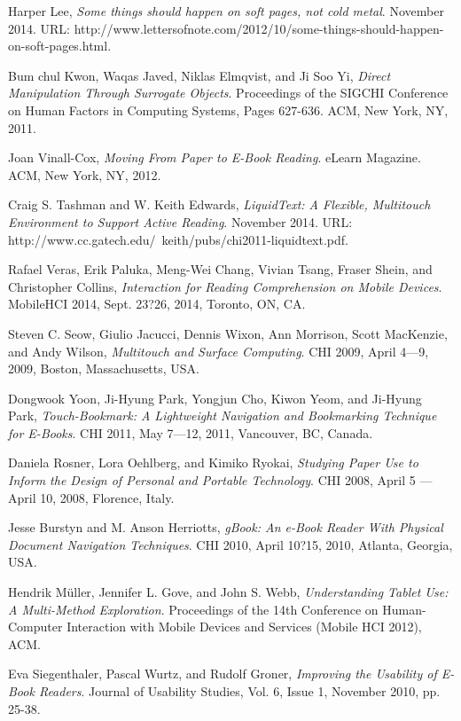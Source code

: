 \documentclass[11pt, oneside]{article}   	%
\begin{document}
\begin{thebibliography}{9}

  Harper Lee,
  \emph{Some things should happen on soft pages, not cold metal}.
  November 2014.
  URL: http://www.lettersofnote.com/2012/10/some-things-should-happen-on-soft-pages.html.
  
  Bum chul Kwon, Waqas Javed, Niklas Elmqvist, and Ji Soo Yi,
  \emph{Direct Manipulation Through Surrogate Objects}.
  Proceedings of the SIGCHI Conference on Human Factors in Computing Systems,
  Pages 627-636.
  ACM, New York, NY,
  2011.
  
  Joan Vinall-Cox,
  \emph{Moving From Paper to E-Book Reading}.
  eLearn Magazine.
  ACM, New York, NY,
  2012.
  
  Craig S. Tashman and W. Keith Edwards,
  \emph{LiquidText: A Flexible, Multitouch Environment to Support Active Reading}.
  November 2014.
  URL: http://www.cc.gatech.edu/~keith/pubs/chi2011-liquidtext.pdf.
  
  Rafael Veras, Erik Paluka, Meng-Wei Chang, Vivian Tsang, Fraser Shein, and Christopher Collins,
  \emph{Interaction for Reading Comprehension on Mobile Devices}.
  MobileHCI 2014, Sept. 23?26, 2014, Toronto, ON, CA.
  
  Steven C. Seow, Giulio Jacucci, Dennis Wixon, Ann Morrison, Scott MacKenzie, and Andy Wilson,
  \emph{ Multitouch and Surface Computing}.
  CHI 2009, April 4---9, 2009, Boston, Massachusetts, USA.
  
  Dongwook Yoon, Ji-Hyung Park, Yongjun Cho, Kiwon Yeom, and Ji-Hyung Park,
  \emph{Touch-Bookmark: A Lightweight Navigation and Bookmarking Technique for E-Books}.
  CHI 2011, May 7---12, 2011, Vancouver, BC, Canada.
   
 Daniela Rosner, Lora Oehlberg, and Kimiko Ryokai,
 \emph{Studying Paper Use to Inform the Design of Personal and Portable Technology}.
 CHI 2008, April 5 ---April 10, 2008, Florence, Italy.

Jesse Burstyn and M. Anson Herriotts,
\emph{gBook: An e-Book Reader With Physical Document Navigation Techniques}.
CHI 2010, April 10?15, 2010, Atlanta, Georgia, USA.

Hendrik M{\"u}ller, Jennifer L. Gove, and John S. Webb,
\emph{Understanding Tablet Use: A Multi-Method Exploration}.
Proceedings of the 14th Conference on Human-Computer Interaction with Mobile Devices and Services (Mobile HCI 2012), ACM.

Eva Siegenthaler, Pascal Wurtz, and Rudolf Groner,
\emph{Improving the Usability of E-Book Readers}.
Journal of Usability Studies, Vol. 6, Issue 1, November 2010, pp. 25-38.

\end{thebibliography}
\end{document}
